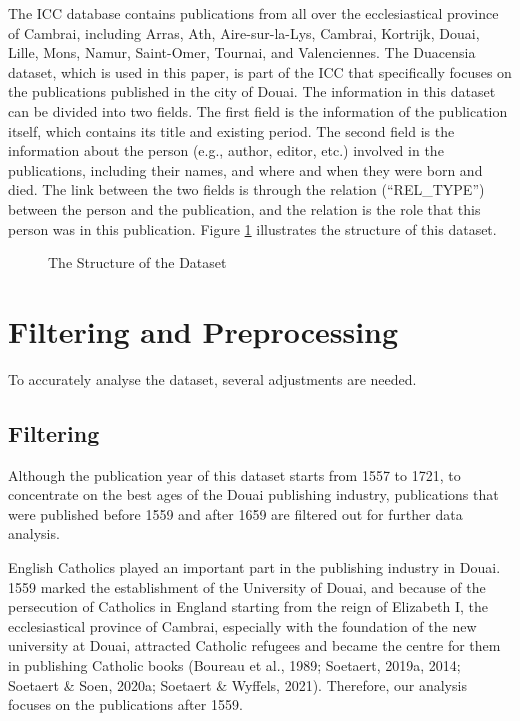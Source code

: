 \documentclass[12pt,a4paper,oneside]{book}
\begin{document}
\begin{sloppypar}
The ICC database contains publications from all over the ecclesiastical province of Cambrai, including Arras, Ath, Aire-sur-la-Lys, Cambrai, Kortrijk, Douai, Lille, Mons, Namur, Saint-Omer, Tournai, and Valenciennes. The Duacensia dataset, which is used in this paper, is part of the ICC that specifically focuses on the publications published in the city of Douai. The information in this dataset can be divided into two fields. The first field is the information of the publication itself, which contains its title and existing period. The second field is the information about the person (e.g., author, editor, etc.) involved in the publications, including their names, and where and when they were born and died. The link between the two fields is through the relation (“REL\_TYPE”) between the person and the publication, and the relation is the role that this person was in this publication. Figure \ref{fig:dataStructure} illustrates the structure of this dataset.

\begin{figure}[H]
\centering

\caption{The Structure of the Dataset}
\label{fig:dataStructure}
\end{figure}

\section{Filtering and Preprocessing}
To accurately analyse the dataset, several adjustments are needed.

\subsection*{Filtering}
Although the publication year of this dataset starts from 1557 to 1721, to concentrate on the best ages of the Douai publishing industry, publications that were published before 1559 and after 1659 are filtered out for further data analysis.

English Catholics played an important part in the publishing industry in Douai. 1559 marked the establishment of the University of Douai, and because of the persecution of Catholics in England starting from the reign of Elizabeth I, the ecclesiastical province of Cambrai, especially with the foundation of the new university at Douai, attracted Catholic refugees and became the centre for them in publishing Catholic books (Boureau et al., 1989; Soetaert, 2019a, 2014; Soetaert \& Soen, 2020a; Soetaert \& Wyffels, 2021). Therefore, our analysis focuses on the publications after 1559.


\end{sloppypar}
\end{document}
